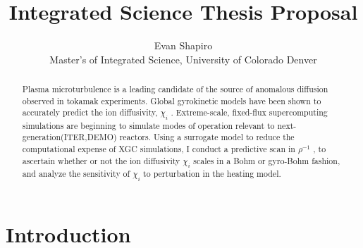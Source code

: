 \documentclass{article}
\title{Integrated Science Thesis Proposal}
\author{Evan Shapiro \\ Master's of Integrated Science, University of Colorado Denver}
\begin{document}
\begin{abstract}
Plasma microturbulence is a leading candidate of the source
of anomalous diffusion observed in %
tokamak experiments. Global gyrokinetic
models have been shown to accurately predict the ion diffusivity, $\chi_i$
. Extreme-scale, fixed-flux supercomputing simulations are beginning
to simulate modes of operation relevant to next-generation(ITER,DEMO)
reactors. Using a surrogate model to reduce the computational expense of XGC simulations, I conduct a predictive scan
in $\rho^{-1}$ , to ascertain
whether or not the ion diffusivity $\chi_i$ scales in a Bohm or gyro-Bohm
fashion, and analyze the sensitivity of $\chi_i$ to perturbation in the heating
model.%
\end{abstract}

\maketitle
\tableofcontents

\maketitle
\tableofcontents


\section{Introduction}
\end{document}
